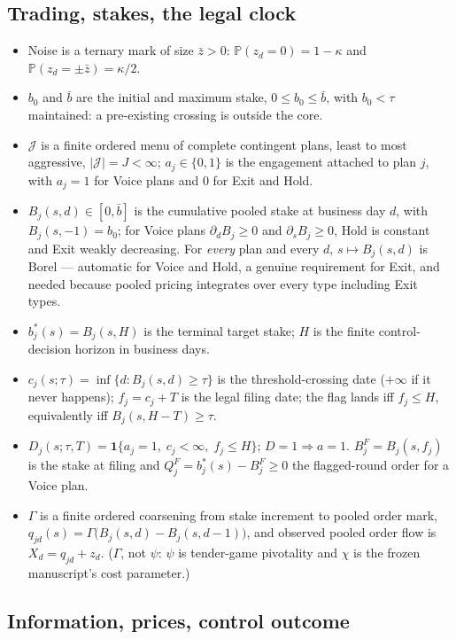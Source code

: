 \documentclass[11pt,a4paper]{article}
\newcommand{\Prb}{\mathbb{P}}
\newcommand{\ind}{\mathbf{1}}
\begin{document}
\subsection*{Trading, stakes, the legal clock}

\begin{itemize}
\item Noise is a ternary mark of size $\bar z>0$: $\Prb(z_d=0)=1-\kappa$ and
  $\Prb(z_d=\pm\bar z)=\kappa/2$.
\item $b_0$ and $\bar b$ are the initial and maximum stake, $0\le b_0\le\bar b$,
  with $b_0<\tau$ maintained: a pre-existing crossing is outside the core.
\item $\mathcal J$ is a finite ordered menu of complete contingent plans, least to
  most aggressive, $|\mathcal J|=J<\infty$; $a_j\in\{0,1\}$ is the engagement
  attached to plan $j$, with $a_j=1$ for Voice plans and $0$ for Exit and Hold.
\item $B_j(s,d)\in[0,\bar b]$ is the cumulative pooled stake at business day $d$,
  with $B_j(s,-1)=b_0$; for Voice plans $\partial_dB_j\ge0$ and $\partial_sB_j\ge0$,
  Hold is constant and Exit weakly decreasing. For \emph{every} plan and every $d$,
  $s\mapsto B_j(s,d)$ is Borel --- automatic for Voice and Hold, a genuine
  requirement for Exit, and needed because pooled pricing integrates over every
  type including Exit types.
\item $b_j^*(s)=B_j(s,H)$ is the terminal target stake; $H$ is the finite
  control-decision horizon in business days.
\item $c_j(s;\tau)=\inf\{d:B_j(s,d)\ge\tau\}$ is the threshold-crossing date
  ($+\infty$ if it never happens); $f_j=c_j+T$ is the legal filing date; the flag
  lands iff $f_j\le H$, equivalently iff $B_j(s,H-T)\ge\tau$.
\item $D_j(s;\tau,T)=\ind\{a_j=1,\;c_j<\infty,\;f_j\le H\}$; $D=1\Rightarrow a=1$.
  $B_j^F=B_j(s,f_j)$ is the stake at filing and
  $Q_j^F=b_j^*(s)-B_j^F\ge0$ the flagged-round order for a Voice plan.
\item $\Gamma$ is a finite ordered coarsening from stake increment to pooled order
  mark, $q_{jd}(s)=\Gamma\bigl(B_j(s,d)-B_j(s,d-1)\bigr)$, and observed pooled order
  flow is $X_d=q_{jd}+z_d$. ($\Gamma$, not $\psi$: $\psi$ is tender-game
  pivotality and $\chi$ is the frozen manuscript's cost parameter.)
\end{itemize}

\subsection*{Information, prices, control outcome}
\end{document}
